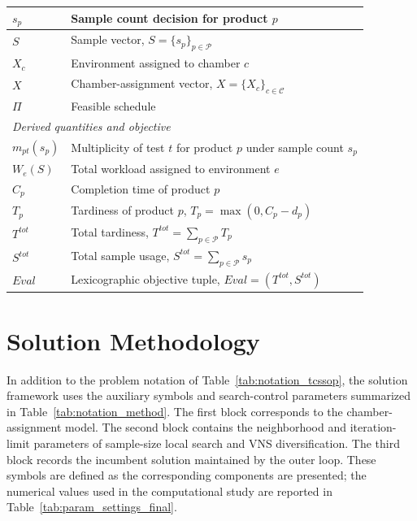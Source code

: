 \documentclass[11pt]{article}
\begin{document}
\begin{table}[H]
\begin{tabular}{|l|p{}|}
\(s_p\) & Sample count decision for product \(p\) \\ \hline
\(S\) & Sample vector, \(S=\{s_p\}_{p\in\mathcal{P}}\) \\ \hline
\(X_c\) & Environment assigned to chamber \(c\) \\ \hline
\(X\) & Chamber-assignment vector, \(X=\{X_c\}_{c\in\mathcal{C}}\) \\ \hline
\(\Pi\) & Feasible schedule \\ \hline
\multicolumn{2}{|l|}{\textit{Derived quantities and objective}} \\ \hline
\(m_{pt}(s_p)\) & Multiplicity of test \(t\) for product \(p\) under sample count \(s_p\) \\ \hline
\(W_e(S)\) & Total workload assigned to environment \(e\) \\ \hline
\(C_p\) & Completion time of product \(p\) \\ \hline
\(T_p\) & Tardiness of product \(p\), \(T_p=\max(0,C_p-d_p)\) \\ \hline
\(T^{tot}\) & Total tardiness, \(T^{tot}=\sum_{p\in\mathcal{P}}T_p\) \\ \hline
\(S^{tot}\) & Total sample usage, \(S^{tot}=\sum_{p\in\mathcal{P}}s_p\) \\ \hline
\(Eval\) & Lexicographic objective tuple, \(Eval=(T^{tot},S^{tot})\) \\ \hline
\end{tabular}
\end{table}

\section{Solution Methodology}
\label{sec:solution}

In addition to the problem notation of Table~\ref{tab:notation_tcssop}, the solution framework uses the auxiliary symbols and search-control parameters summarized in Table~\ref{tab:notation_method}. The first block corresponds to the chamber-assignment model. The second block contains the neighborhood and iteration-limit parameters of sample-size local search and VNS diversification. The third block records the incumbent solution maintained by the outer loop. These symbols are defined as the corresponding components are presented; the numerical values used in the computational study are reported in Table~\ref{tab:param_settings_final}.
\end{document}
